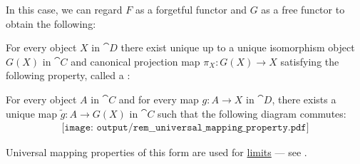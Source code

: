 \begin{remark}
  In this case, we can regard \( F \) as a forgetful functor and \( G \) as a free functor to obtain the following:
  \begin{displayquote}
    For every object \( X \) in \( \cat{D} \) there exist unique up to a unique isomorphism object \( G(X) \) in \( \cat{C} \) and canonical projection map \( \pi_X: G(X) \to X \) satisfying the following property, called a :
    \begin{displayquote}
      For every object \( A \) in \( \cat{C} \) and for every map \( g: A \to X \) in \( \cat{D} \), there exists a unique map \( \widetilde{g}: A \to G(X) \) in \( \cat{C} \) such that the following diagram commutes:
      \begin{equation}\label{eq:rem:universal_mapping_property/d_triangle_forgetful}
        \begin{aligned}
          \texttt{[image: output/rem\_\_universal\_mapping\_property.pdf]}
        \end{aligned}
      \end{equation}
    \end{displayquote}
  \end{displayquote}

  Universal mapping properties of this form are used for \hyperref[def:category_of_cones/limit]{limits} --- see .
\end{remark}
